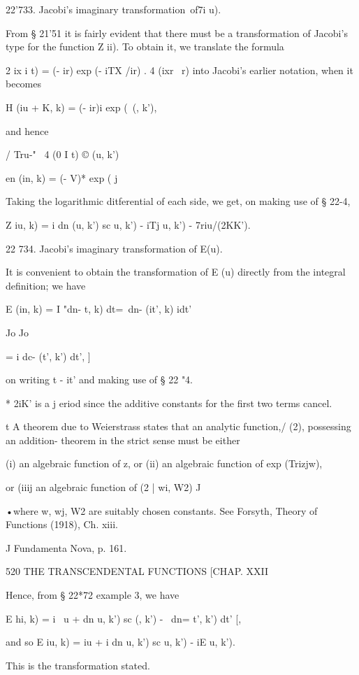 22'733. Jacobi's imaginary transformation\ of7i u).

From § 21'51 it is fairly evident that there must be a transformation
of Jacobi's type for the function Z ii). To obtain it, we translate
the formula

 2 ix i t) = (- ir) exp (- iTX /ir) . 4 (ixr \ r) into Jacobi's
earlier notation, when it becomes

H (iu + K, k) = (- ir)i exp (\ (, k'),

and hence

/ Tru-" \ 4 (0 I t) © (u, k')

en (in, k) = (- V)* exp ( j

Taking the logarithmic ditferential of each side, we get, on making
use of § 22-4,

Z iu, k) = i dn (u, k') sc u, k') - iTj u, k') - 7riu/(2KK').

22 734. Jacobi's imaginary transformation of E(u).

It is convenient to obtain the transformation of E (u) directly from
the integral definition; we have

E (in, k) = I "dn- t, k) dt=\ dn- (it', k) idt'

Jo Jo

= i dc- (t', k') dt', ]

on writing t - it' and making use of § 22 "4.

* 2iK' is a j eriod since the additive constants for the first two
terms cancel.

t A theorem due to Weierstrass states that an analytic function,/ (2),
possessing an addition- theorem in the strict sense must be either

(i) an algebraic function of z, or (ii) an algebraic function of exp
(Trizjw),

or (iiij an algebraic function of (2 | wi, W2) J

•where w, wj, W2 are suitably chosen constants. See Forsyth, Theory of
Functions (1918), Ch. xiii.

J Fundamenta Nova, p. 161.

520 THE TRANSCENDENTAL FUNCTIONS [CHAP. XXII

Hence, from § 22*72 example 3, we have

E hi, k) = i \ u + dn u, k') sc (, k') - \ dn= t', k') dt' [,

and so E iu, k) = iu + i dn u, k') sc u, k') - iE u, k').

This is the transformation stated.

